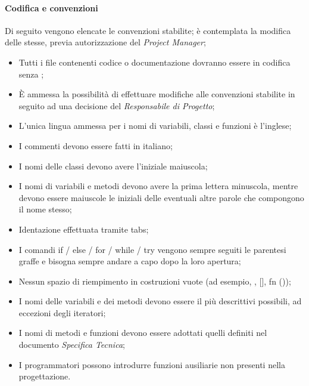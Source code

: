    \paragraph{Codifica e convenzioni}
   Di seguito vengono elencate le convenzioni stabilite; è contemplata la modifica delle stesse, previa autorizzazione del \emph{Project Manager};
\begin{itemize}
\item Tutti i file contenenti codice o documentazione dovranno essere in codifica  senza ;
\item È ammessa la possibilità di effettuare modifiche alle convenzioni stabilite in seguito ad una decisione del \emph{Responsabile di Progetto};
\item L'unica lingua ammessa per i nomi di variabili, classi e funzioni è l'inglese;
\item I commenti devono essere fatti in italiano;
\item I nomi delle classi devono avere l’iniziale maiuscola;
\item I nomi di variabili e metodi devono avere la prima lettera minuscola, mentre devono essere maiuscole le iniziali delle eventuali altre parole che compongono il nome stesso;
\item Identazione effettuata tramite tabs; 
\item I comandi if / else / for / while / try vengono sempre seguiti le parentesi graffe e bisogna sempre andare a capo dopo la loro apertura;
\item Nessun spazio di riempimento in costruzioni vuote (ad esempio, {}, [], fn ());
\item I nomi delle variabili e dei metodi devono essere il più descrittivi possibili, ad eccezioni degli iteratori;
\item I nomi di metodi e funzioni devono essere adottati quelli definiti nel documento \emph{Specifica Tecnica};
\item I programmatori possono introdurre funzioni ausiliarie non presenti nella progettazione.
\end{itemize}   
     
   
